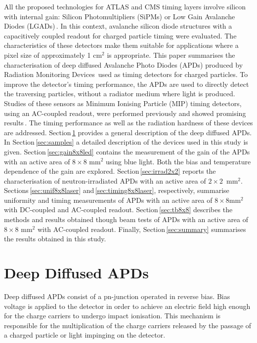 \documentclass[review,number,sort&compress]{elsarticle}
\begin{document}
All the proposed technologies for ATLAS and CMS timing layers involve silicon with internal gain: Silicon Photomultipliers (SiPMs) or Low Gain Avalanche Diodes (LGADs)\,\cite{cmsMIPtiming,atlasMIPtiming}.
In this context, avalanche silicon diode structures with a capacitively coupled readout for charged particle timing were evaluated.
The characteristics of these detectors make them suitable for applications where a pixel size of approximately 1 cm$^{2}$ is appropriate.
This paper summarises the characterisation of deep diffused Avalanche Photo Diodes (APDs) produced by Radiation Monitoring Devices\,\cite{rmdAddress} used as timing detectors for charged particles.
To improve the detector's timing performance, the APDs are used to directly detect the traversing particles, without a radiator medium where light is produced.
Studies of these sensors as Minimum Ionising Particle (MIP) timing detectors, using an AC-coupled readout, were performed previously and showed promising results\,\cite{white2014}.
The timing performance as well as the radiation hardness of these devices are addressed.
Section\,\ref{sec:ddApds} provides a general description of the deep diffused APDs.
In Section\,\ref{sec:samples} a detailed description of the devices used in this study is given.
Section\,\ref{sec:gain8x8led} contains the measurement of the gain of the APDs with an active area of $8 \times 8$ mm$^2$ using blue light. Both the bias and temperature dependence of the gain are explored.
Section\,\ref{sec:irrad2x2} reports the characterisation of neutron-irradiated APDs with an active area of $2 \times 2$~mm$^2$.
Sections\,\ref{sec:unif8x8laser} and\,\ref{sec:timing8x8laser}, respectively, summarise uniformity and timing measurements of APDs with an active area of $8 \times 8$mm$^2$ with DC-coupled and AC-coupled readout.
Section\,\ref{sec:tb8x8} describes the methods and results obtained though beam tests of APDs with an active area of $8 \times 8$ mm$^2$ with AC-coupled readout.
Finally, Section\,\ref{sec:summary} summarises the results obtained in this study.


\section{Deep Diffused APDs}
\label{sec:ddApds}

Deep diffused APDs consist of a pn-junction operated in reverse bias.
Bias voltage is applied to the detector in order to achieve an electric field high enough for the charge carriers to undergo impact ionisation.
This mechanism is responsible for the multiplication of the charge carriers released by the passage of a charged particle or light impinging on the detector.
\end{document}
